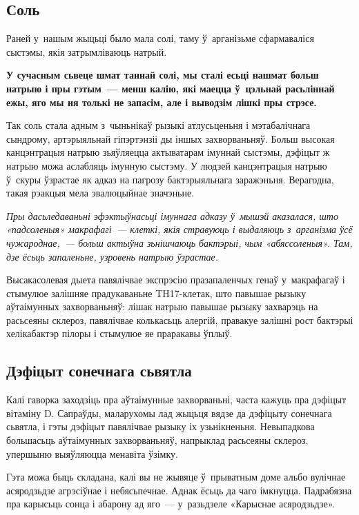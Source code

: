 \subsection*{Соль}

Раней у~нашым жыцьці было мала солі, таму ў~арганізьме сфармаваліся сыстэмы, якія затрымліваюць натрый. 

\textbf{У сучасным сьвеце шмат таннай солі, мы сталі есьці нашмат больш натрыю і пры гэтым~--- менш калію, які маецца ў~цэльнай расьліннай ежы, яго мы ня толькі не запасім, але і выводзім лішкі пры стрэсе.}

Так соль стала адным з~чыньнікаў рызыкі атлусьценьня і мэтабалічнага сындрому, артэрыяльнай гіпэртэнзіі ды іншых захворваньняў. Больш высокая канцэнтрацыя натрыю зьяўляецца актыватарам імуннай сыстэмы, дэфіцыт ж натрыю можа аслабляць імунную сыстэму. У людзей канцэнтрацыя натрыю ў~скуры ўзрастае як адказ на пагрозу бактэрыяльнага заражэньня. Верагодна, такая рэакцыя мела эвалюцыйнае значэньне.

\emph{Пры дасьледаваньні эфэктыўнасьці імуннага адказу ў~мышэй аказалася, што «падсоленыя» макрафагі~--- клеткі, якія стравуюць і выдаляюць з~арганізма ўсё чужароднае,~--- больш актыўна зьнішчаюць бактэрыі, чым «абяссоленыя». Там, дзе ёсьць запаленьне, узровень натрыю ўзрастае.}

Высакасолевая дыета павялічвае экспрэсію празапаленчых генаў у~макрафагаў і стымулюе залішняе прадукаваньне TH17-клетак, што павышае рызыку аўтаімунных захворваньняў: лішак натрыю павышае рызыку захварэць на расьсеяны склероз, павялічвае колькасьць алергій, правакуе залішні рост бактэрыі хелікабактэр пілоры і стымулюе яе праракавы ўплыў.

\subsection*{Дэфіцыт сонечнага сьвятла}

Калі гаворка заходзіць пра аўтаімунные захворваньні, часта кажуць пра дэфіцыт вітаміну D. Сапраўды, маларухомы лад жыцьця вядзе да дэфіцыту сонечнага сьвятла, і гэты дэфіцыт павялічвае рызыку іх узьнікненьня. Невыпадкова большасьць аўтаімунных захворваньняў, напрыклад расьсеяны склероз, упершыню выяўляюцца менавіта ўзімку. 


Гэта можа быць складана, калі вы не жывяце ў~прыватным доме альбо вулічнае асяродзьдзе агрэсіўнае і небясьпечнае. Аднак ёсьць да чаго імкнуцца. Падрабязна пра карысьць сонца і абарону ад яго~--- у~разьдзеле «Карыснае асяродзьдзе».

